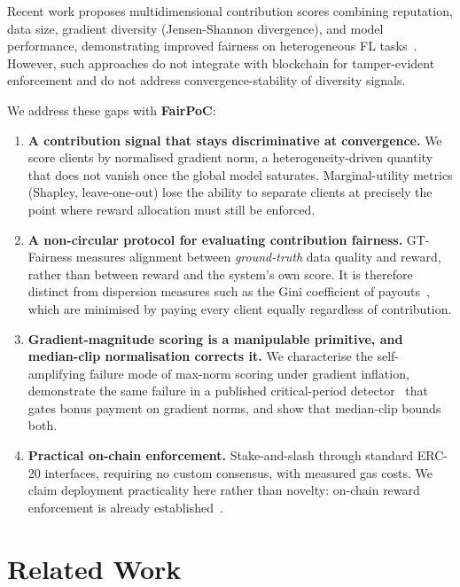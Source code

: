 \documentclass[conference]{IEEEtran}
\theoremstyle{remark}
\begin{document}
Recent work proposes multidimensional contribution scores combining
reputation, data size, gradient diversity (Jensen-Shannon divergence),
and model performance, demonstrating improved fairness on heterogeneous
FL tasks~\cite{wang2020measure, gradient_driven_fairness2021}.
However, such approaches do not integrate with blockchain for
tamper-evident enforcement and do not address convergence-stability of
diversity signals.

We address these gaps with \textbf{FairPoC}:
\begin{enumerate}
  \item \textbf{A contribution signal that stays discriminative at
        convergence.} We score clients by normalised gradient norm, a
        heterogeneity-driven quantity that does not vanish once the
        global model saturates. Marginal-utility metrics (Shapley,
        leave-one-out) lose the ability to separate clients at
        precisely the point where reward allocation must still be
        enforced.
  \item \textbf{A non-circular protocol for evaluating contribution
        fairness.} GT-Fairness measures alignment between
        \emph{ground-truth} data quality and reward, rather than
        between reward and the system's own score. It is therefore
        distinct from dispersion measures such as the Gini coefficient
        of payouts~\cite{he2026blockflmd2c}, which are minimised by
        paying every client equally regardless of contribution.
  \item \textbf{Gradient-magnitude scoring is a manipulable primitive,
        and median-clip normalisation corrects it.} We characterise the
        self-amplifying failure mode of max-norm scoring under gradient
        inflation, demonstrate the same failure in a published
        critical-period detector~\cite{nguyen2026carpediem} that gates
        bonus payment on gradient norms, and show that median-clip
        bounds both.
  \item \textbf{Practical on-chain enforcement.} Stake-and-slash
        through standard ERC-20 interfaces, requiring no custom
        consensus, with measured gas costs. We claim deployment
        practicality here rather than novelty: on-chain reward
        enforcement is already established~\cite{rashid2025tffl,
        dong2022flock}.
\end{enumerate}

\section{Related Work}
\end{document}
